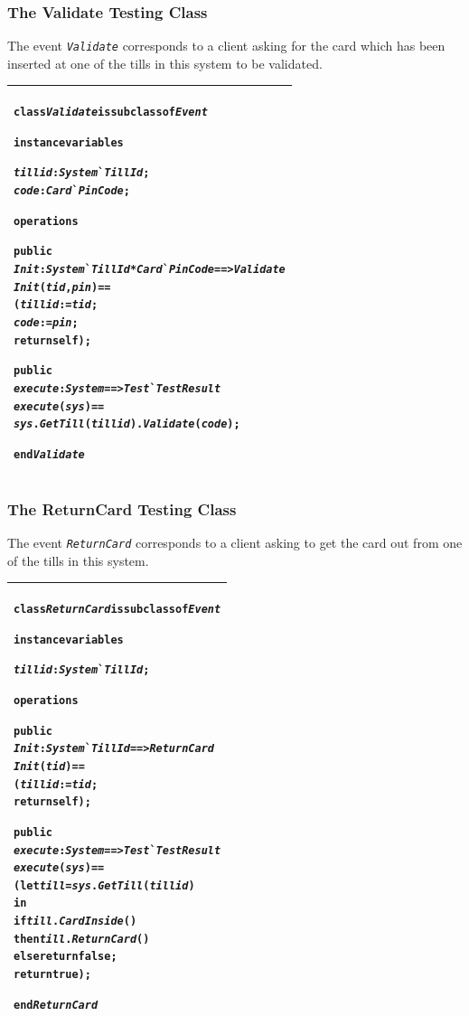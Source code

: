 \documentclass[\pformat,12pt,twoside]{article}
\newenvironment{VDMgray}%
{\begin{tabular}{|G|}\hline\small\begin{alltt}}%
{\end{alltt}\normalsize\\
 \hline\end{tabular}}
\begin{document}
\newpage
\subsubsection{The Validate Testing Class}

The event \texttt{\emph{Validate}} corresponds to a client asking for
the card which has been inserted at one of the tills in this system to
be validated.

\begin{VDMgray}
\textbf{class} \textit{Validate} \textbf{is} \textbf{subclass} \textbf{of} \textit{Event}

\textbf{instance} \textbf{variables}

 \textit{tillid} : \textit{System}\`{}\textit{TillId};
 \textit{code} : \textit{Card}\`{}\textit{PinCode};

\textbf{operations}

 \textbf{public}
 \textit{Init}: \textit{System}\`{}\textit{TillId} * \textit{Card}\`{}\textit{PinCode} ==\texttt{>} \textit{Validate}
 \textit{Init}(\textit{tid},\textit{pin}) ==
   (\textit{tillid} := \textit{tid};
    \textit{code} := \textit{pin};
    \textbf{return} \textbf{self});

 \textbf{public}
 \textit{execute}: \textit{System} ==\texttt{>} \textit{Test}\`{}\textit{TestResult}
 \textit{execute}(\textit{sys}) ==
   \textit{sys}.\textit{GetTill}(\textit{tillid}).\textit{Validate}(\textit{code});

\textbf{end} \textit{Validate}
\end{VDMgray}

\newpage
\subsubsection{The ReturnCard Testing Class}

The event \texttt{\emph{ReturnCard}} corresponds to a client asking to get 
the card out from one of the tills in this system.

\begin{VDMgray}
\textbf{class} \textit{ReturnCard} \textbf{is} \textbf{subclass} \textbf{of} \textit{Event}

\textbf{instance} \textbf{variables}

 \textit{tillid} : \textit{System}\`{}\textit{TillId};

\textbf{operations}

 \textbf{public}
 \textit{Init}: \textit{System}\`{}\textit{TillId} ==\texttt{>} \textit{ReturnCard}
 \textit{Init}(\textit{tid}) ==
   (\textit{tillid} := \textit{tid};
    \textbf{return} \textbf{self});

 \textbf{public}
 \textit{execute}: \textit{System} ==\texttt{>} \textit{Test}\`{}\textit{TestResult}
 \textit{execute}(\textit{sys}) ==
   (\textbf{let} \textit{till} = \textit{sys}.\textit{GetTill}(\textit{tillid})
    \textbf{in}
       \textbf{if} \textit{till}.\textit{CardInside}()
       \textbf{then} \textit{till}.\textit{ReturnCard}()
       \textbf{else} \textbf{return} \textbf{false};
    \textbf{return} \textbf{true});

\textbf{end} \textit{ReturnCard}
\end{VDMgray}
\end{document}

